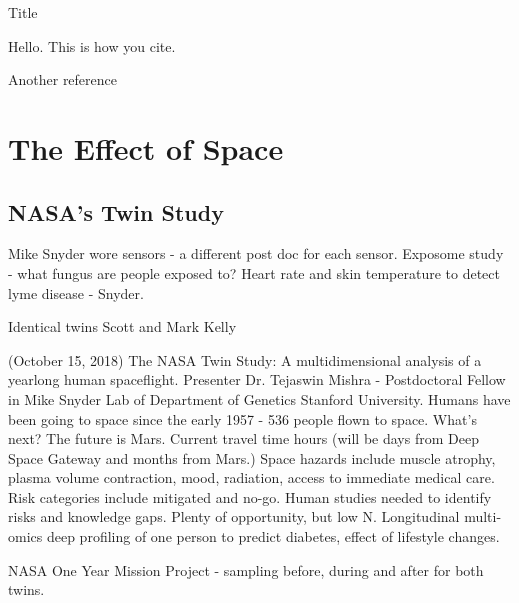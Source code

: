 \documentclass[a4paper, 11pt]{article}
\begin{document}
\tableofcontents

   Title
   
   Hello. This is how you cite. \cite{gustafsson2016best}
   
   Another reference \cite{hamid2015surface}
   
    \section{The Effect of Space}
    \subsection{NASA's Twin Study}
     Mike Snyder wore sensors - a different post doc for each sensor. Exposome study - what fungus are people exposed to? Heart rate and skin temperature to detect lyme disease - Snyder. 
     
     Identical twins Scott and Mark Kelly 
     
    (October 15, 2018) The NASA Twin Study: A multidimensional analysis of a yearlong human spaceflight. Presenter Dr. Tejaswin Mishra - Postdoctoral Fellow in Mike Snyder Lab of  Department of Genetics Stanford University. 
    Humans have been going to space since the early 1957 - 536 people flown to space. What's next?
    The future is Mars. Current travel time hours (will be days from Deep Space Gateway and months from Mars.) Space hazards include muscle atrophy, plasma volume contraction, mood, radiation, access to immediate medical care. Risk categories include mitigated and no-go. 
    Human studies needed to identify risks and knowledge gaps. Plenty of opportunity, but low N. Longitudinal multi-omics deep profiling of one person to predict diabetes, effect of lifestyle changes.
    
    NASA One Year Mission Project - sampling before, during and after for both twins. 
    
\end{document}
